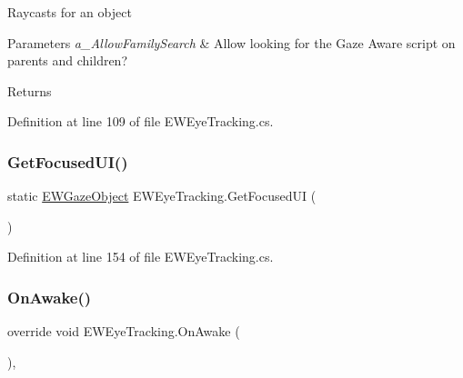 Raycasts for an object 


\begin{DoxyParams}{Parameters}
{\em a\+\_\+\+Allow\+Family\+Search} & Allow looking for the Gaze Aware script on parents and children?\\
\hline
\end{DoxyParams}
\begin{DoxyReturn}{Returns}

\end{DoxyReturn}


Definition at line 109 of file E\+W\+Eye\+Tracking.\+cs.

\mbox{\label{class_e_w_eye_tracking_a9771685d37751b6af20d1bfe5ca3dff3}} 
\subsubsection{\texorpdfstring{Get\+Focused\+U\+I()}{GetFocusedUI()}}
{\footnotesize\ttfamily static \mbox{\hyperlink{class_e_w_gaze_object}{E\+W\+Gaze\+Object}} E\+W\+Eye\+Tracking.\+Get\+Focused\+UI (\begin{DoxyParamCaption}{ }\end{DoxyParamCaption})\hspace{0.3cm}{\ttfamily [static]}}



Definition at line 154 of file E\+W\+Eye\+Tracking.\+cs.

\mbox{\label{class_e_w_eye_tracking_a0f2a94f353f615f9c10721fd2641bdb6}} 
\subsubsection{\texorpdfstring{On\+Awake()}{OnAwake()}}
{\footnotesize\ttfamily override void E\+W\+Eye\+Tracking.\+On\+Awake (\begin{DoxyParamCaption}{ }\end{DoxyParamCaption})\hspace{0.3cm}{\ttfamily [protected]}, {\ttfamily [virtual]}}



